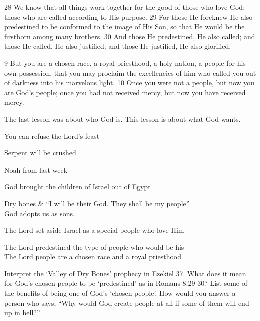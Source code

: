 \begin{bible}

28 We know that all things work together for the good of those who love God: those who are called according to His purpose.  29 For those He foreknew He also predestined to be conformed to the image of His Son, so that He would be the firstborn among many brothers.  30 And those He predestined, He also called; and those He called, He also justified; and those He justified, He also glorified.


9 But you are a chosen race, a royal priesthood, a holy nation, a people for his own possession, that you may proclaim the excellencies of him who called you out of darkness into his marvelous light. 10 Once you were not a people, but now you are God's people; once you had not received mercy, but now you have received mercy.

\end{bible}

\begin{discussion}
The last lesson was about who God is.  This lesson is about what God wants.


 You can refuse the Lord's feast


Serpent will be crushed

Noah from last week

God brought the children of Israel out of Egypt

 Dry bones \& ``I will be their God.  They shall be my people''\\

 God adopts us as sons.\\


 The Lord set aside Israel as a special people who love Him

 The Lord predestined the type of people who would be his\\

 The Lord people are a chosen race and a royal priesthood

\end{discussion}

\begin{questions}
\q Interpret the `Valley of Dry Bones' prophecy in Ezekiel 37.
\q What does it mean for God's chosen people to be `predestined' as in Romans 8:29-30?
\q List some of the benefits of being one of God's `chosen people'.
\q How would you answer a person who says, ``Why would God create people at all if some of them will end up in hell?''
\end{questions}